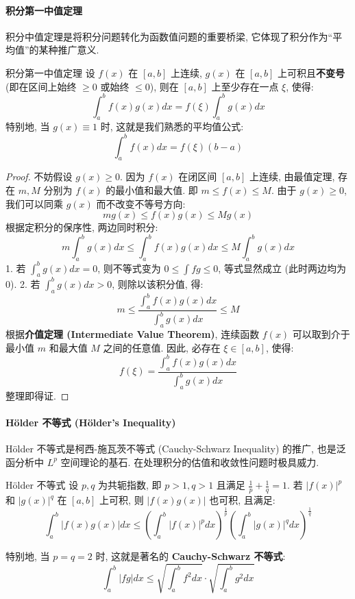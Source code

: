 \documentclass[a4paper,12pt]{ctexart}
\begin{document}
\paragraph{积分第一中值定理}
积分中值定理是将积分问题转化为函数值问题的重要桥梁, 它体现了积分作为“平均值”的某种推广意义.

\begin{mythm}{积分第一中值定理}{}
设 $f(x)$ 在 $[a,b]$ 上连续, $g(x)$ 在 $[a,b]$ 上可积且\textbf{不变号} (即在区间上始终 $\ge 0$ 或始终 $\le 0$), 则在 $[a,b]$ 上至少存在一点 $\xi$, 使得:
$$
\int_a^b f(x)g(x) dx = f(\xi) \int_a^b g(x) dx
$$
特别地, 当 $g(x) \equiv 1$ 时, 这就是我们熟悉的平均值公式:
$$
\int_a^b f(x) dx = f(\xi)(b-a)
$$
\end{mythm}

\newpage

\begin{proof}
不妨假设 $g(x) \ge 0$.
因为 $f(x)$ 在闭区间 $[a,b]$ 上连续, 由最值定理, 存在 $m, M$ 分别为 $f(x)$ 的最小值和最大值.
即 $m \le f(x) \le M$.
由于 $g(x) \ge 0$, 我们可以同乘 $g(x)$ 而不改变不等号方向:
$$
m g(x) \le f(x)g(x) \le M g(x)
$$
根据定积分的保序性, 两边同时积分:
$$
m \int_a^b g(x) dx \le \int_a^b f(x)g(x) dx \le M \int_a^b g(x) dx
$$
1. 若 $\int_a^b g(x) dx = 0$, 则不等式变为 $0 \le \int f g \le 0$, 等式显然成立 (此时两边均为0).
2. 若 $\int_a^b g(x) dx > 0$, 则除以该积分值, 得:
$$
m \le \frac{\int_a^b f(x)g(x) dx}{\int_a^b g(x) dx} \le M
$$
根据\textbf{介值定理 (Intermediate Value Theorem)}, 连续函数 $f(x)$ 可以取到介于最小值 $m$ 和最大值 $M$ 之间的任意值. 因此, 必存在 $\xi \in [a,b]$, 使得:
$$
f(\xi) = \frac{\int_a^b f(x)g(x) dx}{\int_a^b g(x) dx}
$$
整理即得证.
\end{proof}

\paragraph{Hölder 不等式 (Hölder's Inequality)}
Hölder 不等式是柯西-施瓦茨不等式 (Cauchy-Schwarz Inequality) 的推广, 也是泛函分析中 $L^p$ 空间理论的基石. 在处理积分的估值和收敛性问题时极具威力.

\begin{mythm}{Hölder 不等式}{}
设 $p, q$ 为共轭指数, 即 $p>1, q>1$ 且满足 $\frac{1}{p} + \frac{1}{q} = 1$. 若 $|f(x)|^p$ 和 $|g(x)|^q$ 在 $[a,b]$ 上可积, 则 $|f(x)g(x)|$ 也可积, 且满足:
$$
\int_a^b |f(x)g(x)| dx \le \left( \int_a^b |f(x)|^p dx \right)^{\frac{1}{p}} \left( \int_a^b |g(x)|^q dx \right)^{\frac{1}{q}}
$$

特别地, 当 $p=q=2$ 时, 这就是著名的 \textbf{Cauchy-Schwarz 不等式}:
$$
\int_a^b |fg| dx \le \sqrt{\int_a^b f^2 dx} \cdot \sqrt{\int_a^b g^2 dx}
$$
\end{mythm}
\end{document}
